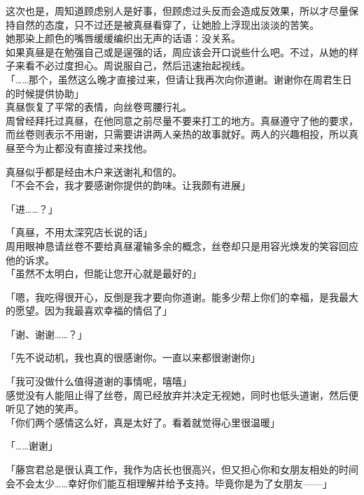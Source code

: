这次也是，周知道顾虑别人是好事，但顾虑过头反而会造成反效果，所以才尽量保持自然的态度，只不过还是被真昼看穿了，让她脸上浮现出淡淡的苦笑。\\

她那染上颜色的嘴唇缓缓编织出无声的话语：没关系。\\

如果真昼是在勉强自己或是逞强的话，周应该会开口说些什么吧。不过，从她的样子来看不必过度担心。周说服自己，然后迅速抬起视线。\\

「……那个，虽然这么晚才直接过来，但请让我再次向你道谢。谢谢你在周君生日的时候提供协助」\\

真昼恢复了平常的表情，向丝卷弯腰行礼。\\

周曾经拜托过真昼，在他同意之前尽量不要来打工的地方。真昼遵守了他的要求，而丝卷则表示不用谢，只需要讲讲两人亲热的故事就好。两人的兴趣相投，所以真昼至今为止都没有直接过来找他。

真昼似乎都是经由木户来送谢礼和信的。\\

「不会不会，我才要感谢你提供的韵味。让我颇有进展」

「进……？」

「真昼，不用太深究店长说的话」\\

周用眼神恳请丝卷不要给真昼灌输多余的概念，丝卷却只是用容光焕发的笑容回应他的诉求。\\

「虽然不太明白，但能让您开心就是最好的」

「嗯，我吃得很开心，反倒是我才要向你道谢。能多少帮上你们的幸福，是我最大的愿望。因为我最喜欢幸福的情侣了」

「谢、谢谢……？」

「先不说动机，我也真的很感谢你。一直以来都很谢谢你」

「我可没做什么值得道谢的事情呢，嘻嘻」\\

感觉没有人能阻止得了丝卷，周已经放弃并决定无视她，同时也低头道谢，然后便听见了她的笑声。\\

「你们两个感情这么好，真是太好了。看着就觉得心里很温暖」

「……谢谢」

「藤宫君总是很认真工作，我作为店长也很高兴，但又担心你和女朋友相处的时间会不会太少……幸好你们能互相理解并给予支持。毕竟你是为了女朋友——」

